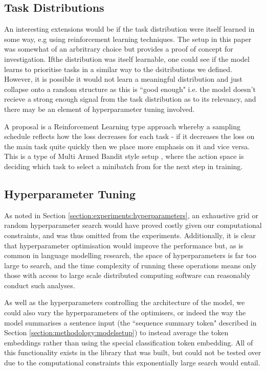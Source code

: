 \subsection{Task Distributions} \label{section:extensions:taskweightings}
An interesting extensions would be if the task distribution were itself learned in some way, e.g using reinforcement learning techniques. The setup in this paper was somewhat of an arbritrary choice but provides a proof of concept for investigation. Ifthe distribution was itself learnable, one could see if the model learns to prioritise tasks in a similar way to the dsitributions we defined. However, it is possible it would not learn a meaningful distribution and just collapse onto a random structure as this is ``good enough" i.e. the model doesn't recieve a strong enough signal from the task distribution as to its relevancy, and there may be an element of hyperparameter tuning involved.

A proposal is a Reinforcement Learning type approach whereby a sampling schedule reflects how the loss decreases for each task - if it decreases the loss on the main task quite quickly then we place more emphasis on it and vice versa. This is a type of Multi Armed Bandit style setup \cite{Kuleshov2000}, where the action space is deciding which task to select a minibatch from for the next step in training.

\subsection{Hyperparameter Tuning} \label{section:extensions:hyperparametertuning}
As noted in Section \ref{section:experiments:hyperparameters}, an exhaustive grid or random hyperparameter search would have proved costly given our computational constraints, and was thus omitted from the experiments. Additionally, it is clear that hyperparameter optimisation would improve the performance but, as is common in language modelling research, the space of hyperparameters is far too large to search, and the time complexity of running these operations means only those with access to large scale distributed computing software can reasonably conduct such analyses.

As well as the hyperparameters controlling the architecture of the model, we could also vary the hyperparameters of the optimisers, or indeed the way the model summarises a sentence input (the ``sequence summary token" described in Section \ref{section:methodology:modelsetup}) to instead average the token embeddings rather than using the special classification token embedding. All of this functionality exists in the library that was built, but could not be tested over due to the computational constraints this exponentially large search would entail.

